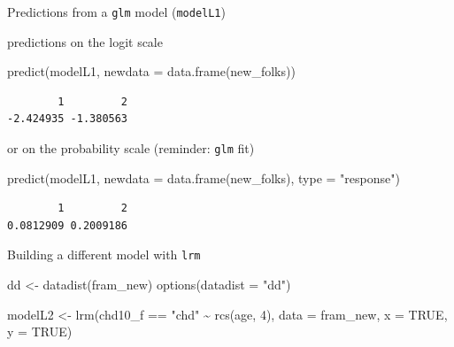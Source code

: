 \documentclass[
  ignorenonframetext,
]{beamer}
\newenvironment{Shaded}{\begin{snugshade}}{\end{snugshade}}
\newcommand{\AttributeTok}[1]{\textcolor[rgb]{0.77,0.63,0.00}{#1}}
\newcommand{\ConstantTok}[1]{\textcolor[rgb]{0.00,0.00,0.00}{#1}}
\newcommand{\DecValTok}[1]{\textcolor[rgb]{0.00,0.00,0.81}{#1}}
\newcommand{\FunctionTok}[1]{\textcolor[rgb]{0.00,0.00,0.00}{#1}}
\newcommand{\NormalTok}[1]{#1}
\newcommand{\OtherTok}[1]{\textcolor[rgb]{0.56,0.35,0.01}{#1}}
\newcommand{\SpecialCharTok}[1]{\textcolor[rgb]{0.00,0.00,0.00}{#1}}
\newcommand{\StringTok}[1]{\textcolor[rgb]{0.31,0.60,0.02}{#1}}
\begin{document}
\begin{frame}[fragile]{Predictions from a \texttt{glm} model
(\texttt{modelL1})}
\protect\hypertarget{predictions-from-a-glm-model-modell1}{}
\begin{block}{predictions on the logit scale}
\protect\hypertarget{predictions-on-the-logit-scale}{}
\begin{Shaded}
\begin{Highlighting}[]
\FunctionTok{predict}\NormalTok{(modelL1, }\AttributeTok{newdata =} \FunctionTok{data.frame}\NormalTok{(new\_folks))}
\end{Highlighting}
\end{Shaded}

\begin{verbatim}
        1         2 
-2.424935 -1.380563 
\end{verbatim}
\end{block}

\begin{block}{or on the probability scale (reminder: \texttt{glm} fit)}
\protect\hypertarget{or-on-the-probability-scale-reminder-glm-fit}{}
\begin{Shaded}
\begin{Highlighting}[]
\FunctionTok{predict}\NormalTok{(modelL1, }\AttributeTok{newdata =} \FunctionTok{data.frame}\NormalTok{(new\_folks),}
        \AttributeTok{type =} \StringTok{"response"}\NormalTok{)}
\end{Highlighting}
\end{Shaded}

\begin{verbatim}
        1         2 
0.0812909 0.2009186 
\end{verbatim}
\end{block}
\end{frame}

\begin{frame}[fragile]{Building a different model with \texttt{lrm}}
\protect\hypertarget{building-a-different-model-with-lrm}{}
\begin{Shaded}
\begin{Highlighting}[]
\NormalTok{dd }\OtherTok{\textless{}{-}} \FunctionTok{datadist}\NormalTok{(fram\_new)}
\FunctionTok{options}\NormalTok{(}\AttributeTok{datadist =} \StringTok{"dd"}\NormalTok{)}

\NormalTok{modelL2 }\OtherTok{\textless{}{-}} \FunctionTok{lrm}\NormalTok{(chd10\_f }\SpecialCharTok{==} \StringTok{"chd"} \SpecialCharTok{\textasciitilde{}} \FunctionTok{rcs}\NormalTok{(age, }\DecValTok{4}\NormalTok{), }
               \AttributeTok{data =}\NormalTok{ fram\_new, }\AttributeTok{x =} \ConstantTok{TRUE}\NormalTok{, }\AttributeTok{y =} \ConstantTok{TRUE}\NormalTok{)}
\end{Highlighting}
\end{Shaded}
\end{frame}
\end{document}

